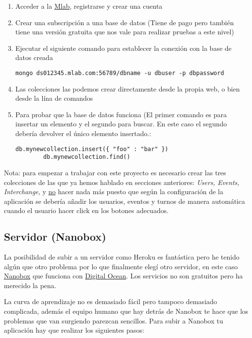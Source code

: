 	\begin{enumerate}
	\item Acceder a la \href{mlab.com}{Mlab}, registrarse y crear una cuenta
	\item Crear una subscripción a una base de datos (Tiene de pago pero también tiene una versión gratuita que nos vale para realizar pruebas a este nivel)
	\item Ejecutar el siguiente comando para establecer la conexión con la base de datos creada
		\lstset{language=C, breaklines=true, basicstyle=\footnotesize}
		\begin{lstlisting}[frame=single]
		mongo ds012345.mlab.com:56789/dbname -u dbuser -p dbpassword
    	\end{lstlisting}
	\item Las colecciones las podemos crear directamente desde la propia web, o bien desde la lína de comandos 
	\item Para probar que la base de datos funciona (El primer comando es para insertar un elemento y el segundo para buscar. En este caso el segundo debería devolver el único elemento insertado.:
		\lstset{language=C, breaklines=true, basicstyle=\footnotesize}
		\begin{lstlisting}[frame=single]
		db.mynewcollection.insert({ "foo" : "bar" })
		db.mynewcollection.find() 
    	\end{lstlisting}	
\end{enumerate}

Nota: para empezar a trabajar con este proyecto es necesario crear las tres colecciones de las que ya hemos hablado en secciones anteriores: \emph{Users, Events, Interchange}, y \underline{no} hacer nada más puesto que según la configuración de la aplicación se debería añadir los usuarios, eventos y turnos de manera automática cuando el usuario hacer click en los botones adecuados. 

\subsection{Servidor (Nanobox)}
La posibilidad de subir a un servidor como Heroku es fantástica pero he tenido algún que otro problema por lo que finalmente elegí otro servidor, en este caso \href{https://nanobox.io}{Nanobox} que funciona con \href{https://www.digitalocean.com/}{Digital Ocean}. Los servicios no son gratuitos pero ha merecido la pena. 

La curva de aprendizaje no es demasiado fácil \cite{nano1} pero tampoco demasiado complicada, además el equipo humano que hay detrás de Nanobox te hace que los problemas que van surgiendo parezcan sencillos. Para subir a Nanobox tu aplicación hay que realizar los siguientes pasos:

